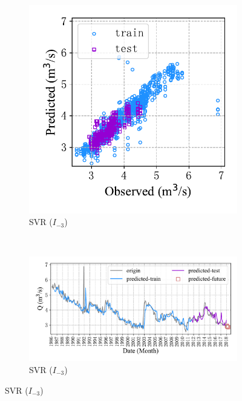 \begin{figure}[!htbp]
\begin{subfigure}[b]{0.615\textwidth}
  \end{subfigure}
  \\
  \begin{subfigure}[b]{0.305\textwidth}
    \includegraphics[width=\textwidth]{Img/chap4_spr/out4/spr_scatter_in_3_out_4_svr.pdf}
    \vspace{-1.2cm}
    \caption{SVR ($I_{-3}$)}
    \label{fig:spr_scatter_in_3_out_4_svr}
  \end{subfigure}
  ~
  \begin{subfigure}[b]{0.615\textwidth}
    \includegraphics[width=\textwidth]{Img/chap4_spr/out4/spr_series_in_3_out_4_svr.pdf}
    \vspace{-1.2cm}
    \caption{SVR ($I_{-3}$)}
    \label{fig:spr_series_in_3_out_4_svr}

\end{subfigure}
\end{figure}
